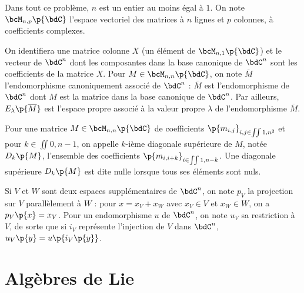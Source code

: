 \documentclass[a4paper,french,bookmarks]{article}
\begin{document}
    \renewcommand{\thesection}{\Roman{section}}
    \renewcommand{\thesection}{\Roman{section}}
    \renewcommand{\labelenumi}{\Roman{section}.\arabic{enumi}.}
    \renewcommand*{\labelenumii}{\alph{enumii}.}

    
    \begin{enumerate}
        \itt Dans tout ce problème, $n$ est un entier au moins égal à $1$. On note $\bcM_{n, p}\p{\bdC}$ l'espace vectoriel des matrices à $n$ lignes et $p$ colonnes, à coefficients complexes.
    
        \itt On identifiera une matrice colonne $X$ (un élément de $\bcM_{n, 1}\p{\bdC}$) et le vecteur de $\bdC^n$ dont les composantes dans la base canonique de $\bdC^n$ sont les coefficients de la matrice $X$. Pour $M \in \bcM_{n, n}\p{\bdC}$, on note $\overline M$ l'endomorphisme canoniquement associé de $\bdC^n$ : $\overline M$ est l'endomorphisme de $\bdC^n$ dont $M$ est la matrice dans la base canonique de $\bdC^n$. Par ailleurs, $E_\lambda\p{\overline M}$ est l'espace propre associé à la valeur propre $\lambda$ de l'endomorphisme $\overline M$.
    
        \itt Pour une matrice $M \in \bcM_{n, n}\p{\bdC}$ de coefficients $\p{m_{i, j}}_{i, j \in \iint{1, n}^2}$ et pour $k \in \iint{0, n-1}$, on appelle $k$-ième diagonale supérieure de $M$, notée $D_k\p{M}$, l'ensemble des coefficients $\p{m_{i, i+k}}_{i \in \iint{1, n-k}}$. Une diagonale supérieure $D_k\p{M}$ est dite nulle lorsque tous ses éléments sont nuls.
    
        \itt Si $V$ et $W$ sont deux espaces supplémentaires de $\bdC^n$, on note $p_V$ la projection sur $V$ parallèlement à $W$ : pour $x = x_V +x_W$ avec $x_V \in V$ et $x_W \in W$, on a $p_V\p{x} = x_V$. Pour un endomorphisme $u$ de $\bdC^n$, on note $u_V$ sa restriction à $V$, de sorte que si $i_V$ représente l'injection de $V$ dans $\bdC^n$, $u_V\p{y} = u\p{i_V\p{y}}$.

    \end{enumerate}
    
    \section{Algèbres de Lie}
    
\end{document}
